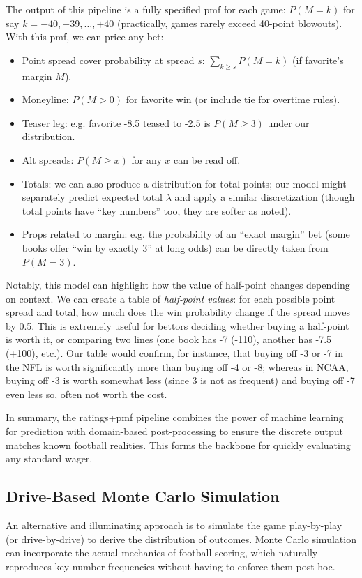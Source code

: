\documentclass[11pt]{amsart}
\begin{document}
The output of this pipeline is a fully specified pmf for each game: $P(M = k)$ for say $k = -40, -39, \dots, +40$ (practically, games rarely exceed 40-point blowouts). With this pmf, we can price any bet:
\begin{itemize}
    \item Point spread cover probability at spread $s$: $\sum_{k \ge s} P(M = k)$ (if favorite’s margin $M$).
    \item Moneyline: $P(M > 0)$ for favorite win (or include tie for overtime rules).
    \item Teaser leg: e.g. favorite -8.5 teased to -2.5 is $P(M \ge 3)$ under our distribution.
    \item Alt spreads: $P(M \ge x)$ for any $x$ can be read off.
    \item Totals: we can also produce a distribution for total points; our model might separately predict expected total $\lambda$ and apply a similar discretization (though total points have “key numbers” too, they are softer as noted).
    \item Props related to margin: e.g. the probability of an ``exact margin'' bet (some books offer ``win by exactly 3'' at long odds) can be directly taken from $P(M=3)$.
\end{itemize}
Notably, this model can highlight how the value of half-point changes depending on context. We can create a table of \emph{half-point values}: for each possible point spread and total, how much does the win probability change if the spread moves by 0.5. This is extremely useful for bettors deciding whether buying a half-point is worth it, or comparing two lines (one book has -7 (-110), another has -7.5 (+100), etc.). Our table would confirm, for instance, that buying off -3 or -7 in the NFL is worth significantly more than buying off -4 or -8; whereas in NCAA, buying off -3 is worth somewhat less (since 3 is not as frequent) and buying off -7 even less so, often not worth the cost.

In summary, the ratings+pmf pipeline combines the power of machine learning for prediction with domain-based post-processing to ensure the discrete output matches known football realities. This forms the backbone for quickly evaluating any standard wager.

\subsection{Drive-Based Monte Carlo Simulation}
An alternative and illuminating approach is to simulate the game play-by-play (or drive-by-drive) to derive the distribution of outcomes. Monte Carlo simulation can incorporate the actual mechanics of football scoring, which naturally reproduces key number frequencies without having to enforce them post hoc.
\end{document}

